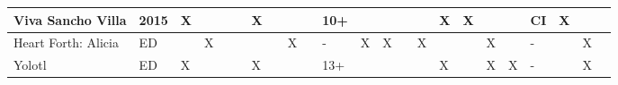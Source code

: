 \begin{table}[]
{\begin{tabular}{|l|l|l|l|l|l|l|l|l|l|l|l|l|l|l|l|l|l|l|l|l|l|l|}
			Viva Sancho Villa                            & 2015                   & X          &             &        &        & X      &          &     &         & 10+  &    &      &           &          & X     & X       &          &          & CI                                          & X          &               &         \\ \hline
			Heart Forth: Alicia                          & ED                     &            & X           &        &        &        &          & X   &         & -    & X  & X    &           & X        &       &         & X        &          & -                                           &            & X             &         \\ \hline
			Yolotl                                       & ED                     & X          &             &        &        & X      &          &     &         & 13+                   &    &      &           &          & X     &         & X        & X        & -                                           &            & X             &         \\ \hline
			
		\end{tabular}
	}
\end{table}